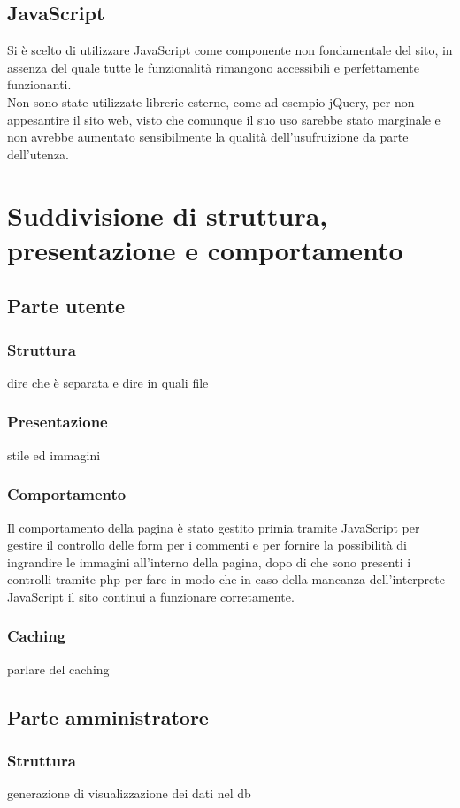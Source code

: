 \documentclass[openany, a4paper, 12pt]{report}
\begin{document}
	\subsection{JavaScript}
	Si è scelto di utilizzare JavaScript come componente non fondamentale del sito, in assenza del quale tutte le funzionalità rimangono accessibili e perfettamente funzionanti.\\
	Non sono state utilizzate librerie esterne, come ad esempio jQuery, per non appesantire il sito web, visto che comunque il suo uso sarebbe stato marginale e non avrebbe aumentato sensibilmente la qualità dell'usufruizione da parte dell'utenza.
	
	\section{Suddivisione di struttura, presentazione e comportamento}
		\subsection{Parte utente}
			\subsubsection{Struttura}
			dire che è separata e dire in quali file
			\subsubsection{Presentazione}
			stile ed immagini
			\subsubsection{Comportamento}
			Il comportamento della pagina è stato gestito primia tramite JavaScript per gestire il controllo delle form per i commenti e per fornire la possibilità di ingrandire le immagini all'interno della pagina, dopo di che sono presenti i controlli tramite php per fare in modo che in caso della mancanza dell'interprete JavaScript il sito continui a funzionare corretamente. 
			\subsubsection{Caching}
			parlare del caching
	
	\subsection{Parte amministratore}
		\subsubsection{Struttura}
		generazione di visualizzazione dei dati nel db
\end{document}
